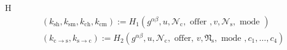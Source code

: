 H
\begin{align*}
        & \left(k_{\mathrm{sh}}, k_{\mathrm{sm}}, k_{\mathrm{ch}}, k_{\mathrm{cm}}\right):=H_1\left(g^{\alpha \beta}, u, \mathcal{N}_{\mathrm{c}}, \text { offer }, v, \mathcal{N}_{\mathrm{s}}, \text { mode }\right) \\
    & \left(k_{\mathrm{c} \rightarrow \mathrm{s}}, k_{\mathrm{s} \rightarrow \mathrm{c}}\right):=H_2\left(g^{\alpha \beta}, u, \mathcal{N}_{\mathrm{c}}, \text { offer, } v, \mathfrak{N}_{\mathrm{s}}, \text { mode }, c_1, \ldots, c_4\right) \\
    &
\end{align*}